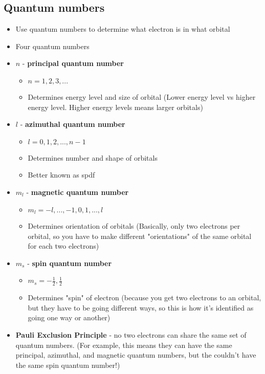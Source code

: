 \documentclass[letterpaper, 12pt]{article}
\begin{document}
	\subsection{Quantum numbers}
	\begin{itemize}
		\item Use quantum numbers to determine what electron is in what orbital
		\item Four quantum numbers
		\item \textbf{$n$} - \textbf{principal quantum number}
		\begin{itemize}
			\item $n = 1, 2, 3, ...$
			\item Determines energy level and size of orbital (Lower energy level vs higher energy level. Higher energy levels means larger orbitals)
		\end{itemize}
		\item \textbf{$l$} - \textbf{azimuthal quantum number}
		\begin{itemize}
			\item $l = 0, 1, 2, ..., n-1$
			\item Determines number and shape of orbitals
			\item Better known as spdf
		\end{itemize}
		\item \textbf{$m_{l}$} - \textbf{magnetic quantum number}
		\begin{itemize}
			\item $m_{l} = -l, ..., -1, 0, 1, ..., l$
			\item Determines orientation of orbitals (Basically, only two electrons per orbital, so you have to make different "orientations" of the same orbital for each two electrons)
		\end{itemize}
		\item \textbf{$m_{s}$} - \textbf{spin quantum number}
		\begin{itemize}
			\item $m_{s} = -\frac{1}{2}, \frac{1}{2}$
			\item Determines "spin" of electron (because you get two electrons to an orbital, but they have to be going different ways, so this is how it's identified as going one way or another)
		\end{itemize}
		\item \textbf{Pauli Exclusion Principle} - no two electrons can share the same set of quantum numbers. (For example, this means they can have the same principal, azimuthal, and magnetic quantum numbers, but the couldn't have the same spin quantum number!)
	\end{itemize}
\clearpage
\end{document}
